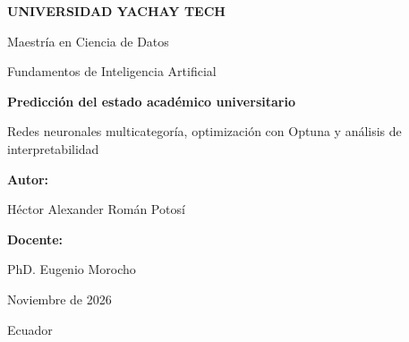 \documentclass[11pt,a4paper]{article}
\begin{document}

\begin{titlepage}
\centering
\vspace*{2.5cm}

{\Large\bfseries UNIVERSIDAD YACHAY TECH\par}
\vspace{0.4cm}
{\large Maestría en Ciencia de Datos\par}
{\large Fundamentos de Inteligencia Artificial\par}

\vspace{2.5cm}

{\Huge\bfseries Predicción del estado académico universitario\par}

\vspace{0.7cm}

{\LARGE Redes neuronales multicategoría,
optimización con Optuna y análisis de interpretabilidad\par}

\vspace{2cm}

{\large\textbf{Autor:}\par}
{\large Héctor Alexander Román Potosí\par}

\vspace{0.8cm}

{\large\textbf{Docente:}\par}
{\large PhD. Eugenio Morocho\par}

\vfill
{\large Noviembre de 2026\par}
{\large Ecuador\par}

\end{titlepage}

\end{document}
